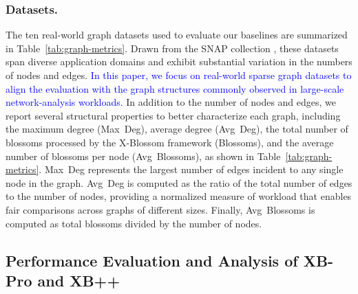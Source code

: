 \subsubsection{Datasets.}
The ten real-world graph datasets used to evaluate our baselines are summarized in Table~\ref{tab:graph-metrics}.
Drawn from the SNAP collection \cite{SNAP_Dataset}, these datasets span diverse application domains and exhibit substantial variation in the numbers of nodes and edges.
\label{para:real-world-sparse-datasets}
\textcolor{blue}{In this paper, we focus on real-world sparse graph datasets to align the evaluation with the graph structures commonly observed in large-scale network-analysis workloads.
}
In addition to the number of nodes and edges, we report several structural properties to better characterize each graph, including the maximum degree (Max~Deg), average degree (Avg~Deg), the total number of blossoms processed by the X-Blossom framework (Blossoms), and the average number of blossoms per node (Avg~Blossoms), as shown in Table~\ref{tab:graph-metrics}.
Max~Deg represents the largest number of edges incident to any single node in the graph. 
Avg~Deg is computed as the ratio of the total number of edges to the number of nodes, providing a normalized measure of workload that enables fair comparisons across graphs of different sizes.
Finally, Avg~Blossoms is computed as total blossoms divided by the number of nodes.



\subsection{Performance Evaluation and Analysis of XB-Pro and XB++}
